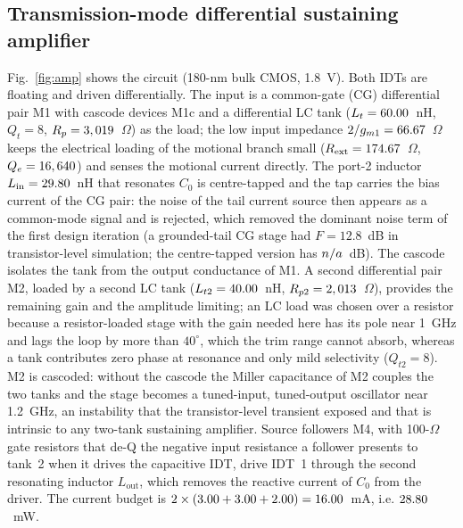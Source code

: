 \documentclass[journal]{IEEEtran}
\begin{document}
\subsection{Transmission-mode differential sustaining amplifier}\label{sec:amp}
Fig.~\ref{fig:amp} shows the circuit (180-nm bulk CMOS, 1.8~V). Both IDTs are floating and driven differentially. The input is a common-gate (CG) differential pair M1 with cascode devices M1c and a differential LC tank ($L_t=60.00$~nH, $Q_t=8$, $R_p=3,019$~$\Omega$) as the load; the low input impedance $2/g_{m1}=66.67$~$\Omega$ keeps the electrical loading of the motional branch small ($R_{\mathrm{ext}}=174.67$~$\Omega$, $Q_e=16,640$) and senses the motional current directly. The port-2 inductor $L_{\mathrm{in}}=29.80$~nH that resonates $C_0$ is centre-tapped and the tap carries the bias current of the CG pair: the noise of the tail current source then appears as a common-mode signal and is rejected, which removed the dominant noise term of the first design iteration (a grounded-tail CG stage had $F=12.8$~dB in transistor-level simulation; the centre-tapped version has $n/a$~dB). The cascode isolates the tank from the output conductance of M1. A second differential pair M2, loaded by a second LC tank ($L_{t2}=40.00$~nH, $R_{p2}=2,013$~$\Omega$), provides the remaining gain and the amplitude limiting; an LC load was chosen over a resistor because a resistor-loaded stage with the gain needed here has its pole near 1~GHz and lags the loop by more than $40^\circ$, which the trim range cannot absorb, whereas a tank contributes zero phase at resonance and only mild selectivity ($Q_{t2}=8$). M2 is cascoded: without the cascode the Miller capacitance of M2 couples the two tanks and the stage becomes a tuned-input, tuned-output oscillator near 1.2~GHz, an instability that the transistor-level transient exposed and that is intrinsic to any two-tank sustaining amplifier. Source followers M4, with 100-$\Omega$ gate resistors that de-Q the negative input resistance a follower presents to tank~2 when it drives the capacitive IDT, drive IDT~1 through the second resonating inductor $L_{\mathrm{out}}$, which removes the reactive current of $C_0$ from the driver. The current budget is $2\times(3.00+3.00+2.00)=16.00$~mA, i.e. $28.80$~mW.
\end{document}
